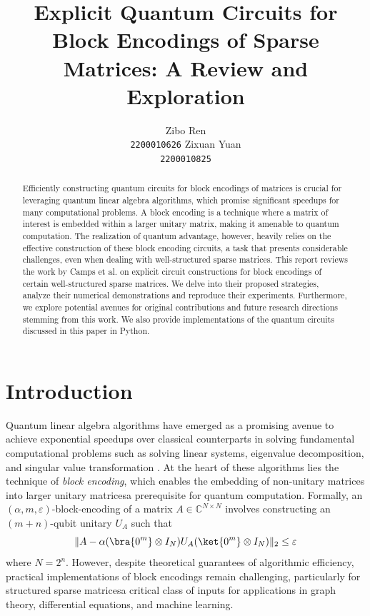 \documentclass{article}
\title{Explicit Quantum Circuits for Block Encodings of Sparse Matrices: A Review and Exploration}
\author{%
    \large Zibo Ren \\
    \large \texttt{2200010626}
    \And
    \large Zixuan Yuan \\
    \large \texttt{2200010825}
}
\begin{document}
    \maketitle

    \begin{abstract}

        Efficiently constructing quantum circuits for block encodings of matrices is crucial for leveraging quantum linear algebra algorithms, which promise significant speedups for many computational problems.
        A block encoding is a technique where a matrix of interest is embedded within a larger unitary matrix, making it amenable to quantum computation.
        The realization of quantum advantage, however, heavily relies on the effective construction of these block encoding circuits, a task that presents considerable challenges, even when dealing with well-structured sparse matrices.
        This report reviews the work by Camps et al. \cite{EQC} on explicit circuit constructions for block encodings of certain well-structured sparse matrices.
        We delve into their proposed strategies, analyze their numerical demonstrations and reproduce their experiments.
        Furthermore, we explore potential avenues for original contributions and future research directions stemming from this work.
        We also provide implementations of the quantum circuits discussed in this paper in Python.

    \end{abstract}


    \section{Introduction}

    Quantum linear algebra algorithms have emerged as a promising avenue to achieve exponential speedups over classical counterparts in solving fundamental computational problems such as solving linear systems, eigenvalue decomposition, and singular value transformation \cite{EQC}. At the heart of these algorithms lies the technique of \emph{block encoding}, which enables the embedding of non-unitary matrices into larger unitary matrices\textemdash a prerequisite for quantum computation. Formally, an $(\alpha, m, \varepsilon)$-block-encoding of a matrix $A \in \mathbb{C}^{N \times N}$ involves constructing an $(m+n)$-qubit unitary $U_A$ such that
    \begin{equation}
        \|A - \alpha(\bra{0^m} \otimes I_N)U_A(\ket{0^m} \otimes I_N)\|_2 \leq \varepsilon
    \end{equation}
    where $N=2^n$. However, despite theoretical guarantees of algorithmic efficiency, practical implementations of block encodings remain challenging, particularly for structured sparse matrices\textemdash a critical class of inputs for applications in graph theory, differential equations, and machine learning.
\end{document}
